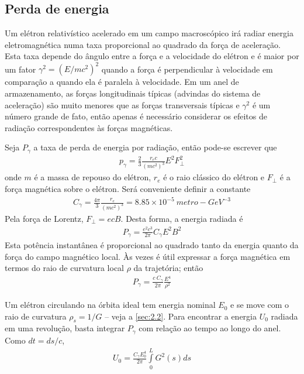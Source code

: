 \subsection{Perda de energia}\label{sec:4.1}
Um elétron relativístico acelerado em um campo macroscópico irá radiar energia eletromagnética numa taxa proporcional ao quadrado da força de aceleração. Esta taxa depende do ângulo entre a força e a velocidade do elétron e é maior por um fator $\gamma^2 = (E/mc^2)^2$ quando a força é perpendicular à velocidade em comparação a quando ela é paralela à velocidade. Em um anel de armazenamento, as forças longitudinais típicas (advindas do sistema de aceleração) são muito menores que as forças transversais típicas e $\gamma^2$ é um número grande de fato, então apenas é necessário considerar os efeitos de radiação correspondentes às forças magnéticas.

Seja $P_\gamma$ a taxa de perda de energia por radiação, então pode-se escrever que
\begin{align}
	p_\gamma = \frac{2}{3}\frac{r_e c}{(mc^2)^3} E^2 F_\perp^2
\end{align}
onde $m$ é a massa de repouso do elétron, $r_e$ é o raio clássico do elétron e $F_\perp$ é a força magnética sobre o elétron. Será conveniente definir a constante
\begin{align}
	C_\gamma = \frac{4\pi}{3}\frac{r_e}{(mc^2)^3} = 8.85 \times 10^{-5}\ metro-GeV^{-3}
\end{align}
Pela força de Lorentz, $F_\perp = ecB$. Desta forma, a energia radiada é
\begin{align}
	P_\gamma = \frac{e^2c^3}{2\pi}C_\gamma E^2 B^2
\end{align}
Esta potência instantânea é proporcional ao quadrado tanto da energia quanto da força do campo magnético local. Às vezes é útil expressar  a força magnética em termos do raio de curvatura local $\rho$ da trajetória; então
\begin{align}
	P_\gamma = \frac{c\ C_\gamma}{2\pi}\frac{E^4}{\rho^2}
\end{align}

Um elétron circulando na órbita ideal tem energia nominal $E_0$ e se move com o raio de curvatura $\rho_s = 1/G$ -- veja a \autoref{sec:2.2}. Para encontrar a energia $U_0$ radiada em uma revolução, basta integrar $P_\gamma$ com relação ao tempo  ao longo do anel. Como $dt = ds/c$,
\begin{align}
	U_0 = \frac{C_\gamma E_0^4}{2\pi}\int\limits_{0}^{L}G^2(s)ds
\end{align}

